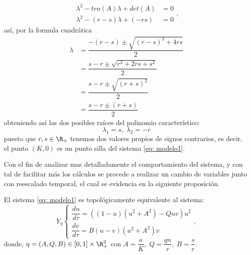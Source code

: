{\begin{enumerate}
		\begin{equation}
			\begin{aligned}
				\lambda^{2} - tra(A)\lambda + det(A) &= 0 \\
				\lambda^{2} - (r-s)\lambda + (-rs) &= 0
			\end{aligned},
		\end{equation}
		así, por la formula cuadrática
		\begin{equation}
			\begin{aligned}
				\lambda &= \dfrac{-(r-s) \pm \sqrt{(r-s)^{2}+4rs}}{2} \\
				&= \dfrac{s-r \pm \sqrt{r^{2}+2rs+s^{2}}}{2} \\
				&= \dfrac{s-r \pm \sqrt{(r+s)^{2}}}{2} \\
				&= \dfrac{s-r \pm (r+s)}{2} 
			\end{aligned}
		\end{equation}
		obteniendo así las dos posibles raíces del polinomio característico: $$\lambda_{1} = s, \; \lambda_{2}=-r$$ puesto que $r,s \in \R_{+}$ tenemos dos valores propios de signos contrarios, es decir, el punto $(K,0)$ es un punto silla del sistema \eqref{eq: modelo1}.
    \end{enumerate}
    
    Con el fin de analizar mas detalladamente el comportamiento del sistema, y con tal de facilitar más los cálculos se procede a realizar un cambio de variables junto con reescalado temporal, el cual se evidencia en la siguiente proposición.
    
    \begin{pro}
    	El sistema \eqref{eq: modelo1} es topológicamente equivalente al sistema:
    	\begin{equation}
    		Y_{\eta}
    		\begin{cases}
    			\dfrac{du}{d \tau} = ((1 - u)(u^{2} + A^{2}) - Q u v)u^{2}\\
    			\dfrac{dv}{d \tau} = B(u - v)(u^{2} + A^{2})v
    		\end{cases},
    		\label{eq: modelo2}
    	\end{equation}
    	donde, $\eta = (A, Q, B) \in [0, 1] \times \R^{2}_{+}$ con $A = \dfrac{a}{K}, \; Q = \dfrac{qn}{r}, \; B = \dfrac{s}{r}$.
    \end{pro}
    
}
